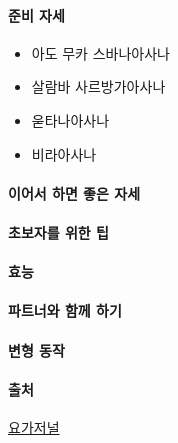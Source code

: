 \documentclass[12pt, a4paper, oneside]{book}
\begin{document}
\paragraph{준비 자세}

			\begin{itemize}[topsep=0.0em, parsep=0.0em, itemsep=0em, leftmargin=6.0em, labelwidth=3em, labelsep=3em] 
			\item 아도 무카 스바나아사나
			\item 살람바 사르방가아사나
			\item 욷타나아사나
			\item 비라아사나
			\end{itemize}



\paragraph{이어서 하면 좋은 자세}


\paragraph{초보자를 위한 팁}

\paragraph{효능}

\paragraph{파트너와 함께 하기}


\paragraph{변형 동작}
















\paragraph{출처}

	\href{http://www.yogajournal.kr/news/articleView.html?idxno=188}
		{요가저널}
\end{document}
